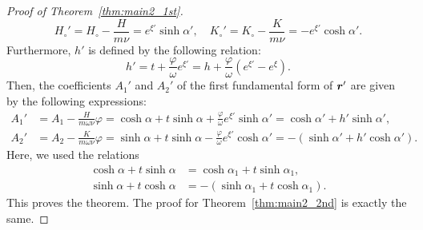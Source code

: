 \documentclass[10pt,a4paper]{amsart}
\def\br{\mbox{\boldmath $r$}}
\begin{document}
\begin{proof}[Proof of Theorem~\ref{thm:main2_1st}]
\begin{equation}
H_\circ' 
= H_\circ - \frac{H}{m\nu} = e^{\xi'} \sinh \alpha',\quad
K_\circ' 
= K_\circ - \frac{K}{m\nu} = - e^{\xi'} \cosh \alpha'.
\end{equation}
Furthermore, $h'$ is defined by the following relation:
\begin{equation}
h' 
= t + \frac{\varphi}{\omega}e^{\xi'}
= h + \frac{\varphi}{\omega}(e^{\xi'} - e^\xi).
\end{equation}
Then, the coefficients $A_1'$ and $A_2'$ of the first fundamental form of $\br'$ are given by the following expressions:
\begin{equation}
\begin{aligned}
A_1' &= A_1 - \frac{H}{m \omega \nu} \varphi
= \cosh \alpha + t \sinh \alpha + \frac{\varphi}{\omega} e^{\xi'} \sinh \alpha'
= \cosh \alpha' + h' \sinh \alpha',\\
A_2' &= A_2 - \frac{K}{m \omega \nu} \varphi
= \sinh \alpha + t \sinh \alpha - \frac{\varphi}{\omega} e^{\xi'} \cosh \alpha'
= - (\sinh \alpha' + h' \cosh \alpha').
\end{aligned}
\end{equation}
Here, we used the relations
\begin{equation}
\begin{aligned}
\cosh \alpha + t \sinh \alpha &= \cosh \alpha_1 + t \sinh \alpha_1, \\
\sinh \alpha + t \cosh \alpha &= - (\sinh \alpha_1 + t \cosh \alpha_1).
\end{aligned}
\end{equation}
This proves the theorem.
The proof for Theorem~\ref{thm:main2_2nd} is exactly the same.
\end{proof}
\end{document}
